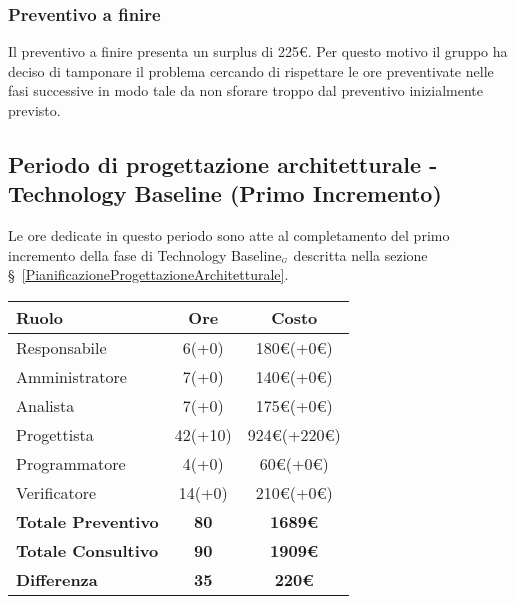 {{{\subsubsection{Preventivo a finire}
Il preventivo a finire presenta un surplus di 225\euro. Per questo motivo il gruppo ha deciso di tamponare il problema cercando di rispettare le ore preventivate nelle fasi successive in modo tale da non sforare troppo dal preventivo inizialmente previsto.

\subsection{Periodo di progettazione architetturale - Technology Baseline (Primo Incremento)}\label{ConsuntivoPeriodoDiProgettazioneArchitetturaleTechnologyBaselinePrimoIncremento}

Le ore dedicate in questo periodo sono atte al completamento del primo incremento della fase di Technology Baseline$_{\scaleto{G}{3pt}}$ descritta nella sezione \S~\ref{PianificazioneProgettazioneArchitetturale}.

\quad
\def\tabularxcolumn#1{m{#1}}
{
	\begin{center}
		\renewcommand{\arraystretch}{1.4}
		\begin{tabularx}{10cm}{|X|c|c|}
			\hline
			\rowcolor{airforceblue}
			\textbf{Ruolo} & \textbf{Ore} & \textbf{Costo}\\
			\hline
			Responsabile & 6(+0) & 180\euro(+0\euro)\\
			\hline
			Amministratore & 7(+0) & 140\euro(+0\euro)\\
			\hline
			Analista & 7(+0) & 175\euro(+0\euro)\\
			\hline
			Progettista & 42(+10) & 924\euro(+220\euro)\\
			\hline
			Programmatore & 4(+0) & 60\euro(+0\euro)\\
			\hline
			Verificatore & 14(+0) & 210\euro(+0\euro)\\
			\hline
			\textbf{Totale Preventivo} & \textbf{80} & \textbf{1689\euro}\\
			\hline
			\textbf{Totale Consultivo} & \textbf{90} & \textbf{1909\euro}\\
			\hline
			\textbf{Differenza} & \textbf{35} & \textbf{220\euro}
		\end{tabularx}
	\end{center}

}}}}
